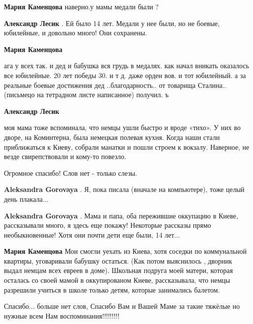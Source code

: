 \begin{itemize}
\begin{itemize}
\begin{itemize}
\textbf{Мария Каменцова} наверно.у мамы медали были ?

\textbf{Александр Лесик} . Ей было 14 лет. Медали у нее были, но не боевые, юбилейные, и довольно много! Они сохранены.

\textbf{Мария Каменцова} 

ага у всех так. и дед и бабушка вся грудь в медалях. как начал вникать оказалось
все юбилейные. 20 лет победы 30. и т д. даже орден вов. и тот юбилейный. а за
реальные боевые достижения дед ..благодарность.. от товарища Сталина.. (письмецо
на тетрадном листе написанное) получил. ъ

\textbf{Александр Лесик} 

моя мама тоже вспоминала, что немцы ушли быстро и вроде «тихо». У них во дворе,
на Коминтерна, была немецкая полевая кухня. Когда наши стали приближаться к
Киеву, собрали манатки и пошли строем к вокзалу. Наверное, не везде
свирепствовали и кому-то повезло.

\end{itemize} %

\end{itemize} %

Огромное спасибо! Слов нет - только слезы.

\begin{itemize} %
\textbf{Aleksandra Gorovaya} . Я, пока писала (вначале на компьютере), тоже целый день плакала...

\textbf{Aleksandra Gorovaya} . Мама и папа, оба пережившие оккупацию в Киеве, рассказывали много, я здесь еще покажу! Некоторые рассказы прямо необыкновенные! Хотя они почти дети еще были, 14 лет...

\begin{itemize} %
\textbf{Мария Каменцова} Мои смогли уехать из Киева, хотя соседки по коммунальной квартиры, уговаривали бабушку остаться. (Как потом выяснилось , дворник выдал немцам всех евреев в доме). Школьная подруга моей матери, которая осталась со своей мамой в оккупированом Киеве, рассказывала, что немцы разрешили учиться в школе только детям, которые занимались балетом.
\end{itemize} %

\end{itemize} %

Спасибо... больше нет слов, Спасибо Вам и Вашей Маме за такие тяжёлые но нужные всем Нам воспоминания!!!!!!!!!


\end{itemize}
